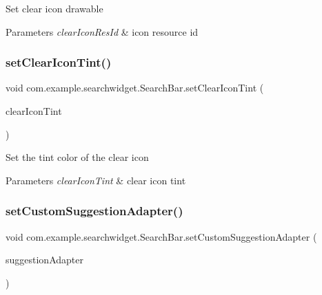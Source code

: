 Set clear icon drawable


\begin{DoxyParams}{Parameters}
{\em clear\+Icon\+Res\+Id} & icon resource id \\
\hline
\end{DoxyParams}
\mbox{\label{classcom_1_1example_1_1searchwidget_1_1_search_bar_aed6f9a5ee6a225ee697304e6a3ed5d5d}} 
\subsubsection{\texorpdfstring{setClearIconTint()}{setClearIconTint()}}
{\footnotesize\ttfamily void com.\+example.\+searchwidget.\+Search\+Bar.\+set\+Clear\+Icon\+Tint (\begin{DoxyParamCaption}\item[{int}]{clear\+Icon\+Tint }\end{DoxyParamCaption})}

Set the tint color of the clear icon


\begin{DoxyParams}{Parameters}
{\em clear\+Icon\+Tint} & clear icon tint \\
\hline
\end{DoxyParams}
\mbox{\label{classcom_1_1example_1_1searchwidget_1_1_search_bar_ac3d6b348b32c8129fca764c3cfe9b810}} 
\subsubsection{\texorpdfstring{setCustomSuggestionAdapter()}{setCustomSuggestionAdapter()}}
{\footnotesize\ttfamily void com.\+example.\+searchwidget.\+Search\+Bar.\+set\+Custom\+Suggestion\+Adapter (\begin{DoxyParamCaption}\item[{\mbox{\hyperlink{classcom_1_1example_1_1searchwidget_1_1adapter_1_1_suggestions_adapter}{Suggestions\+Adapter}}}]{suggestion\+Adapter }\end{DoxyParamCaption})}

